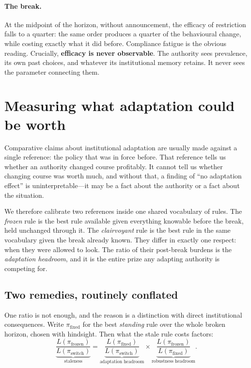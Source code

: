 \documentclass[11pt]{article}
\begin{document}
\paragraph{The break.} At the midpoint of the horizon, without announcement, the efficacy of
restriction falls to a quarter: the same order produces a quarter of the behavioural change, while
costing exactly what it did before. Compliance fatigue is the obvious reading. Crucially,
\textbf{efficacy is never observable}. The authority sees prevalence, its own past choices, and
whatever its institutional memory retains. It never sees the parameter connecting them.

\section{Measuring what adaptation could be worth}
\label{sec:headroom-social}

Comparative claims about institutional adaptation are usually made against a single reference: the
policy that was in force before. That reference tells us whether an authority changed course
profitably. It cannot tell us whether changing course was worth much, and without that, a finding of
``no adaptation effect'' is uninterpretable---it may be a fact about the authority or a fact about
the situation.

We therefore calibrate two references inside one shared vocabulary of rules. The \emph{frozen} rule
is the best rule available given everything knowable before the break, held unchanged through it.
The \emph{clairvoyant} rule is the best rule in the same vocabulary given the break already known.
They differ in exactly one respect: when they were allowed to look. The ratio of their post-break
burdens is the \emph{adaptation headroom}, and it is the entire prize any adapting authority is
competing for.

\subsection{Two remedies, routinely conflated}
\label{sec:two-remedies}

One ratio is not enough, and the reason is a distinction with direct institutional consequences.
Write $\pi_{\mathrm{fixed}}$ for the best \emph{standing} rule over the whole broken horizon, chosen
with hindsight. Then what the stale rule costs factors:
\begin{equation}
\underbrace{\frac{L(\pi_{\mathrm{frozen}})}{L(\pi_{\mathrm{switch}})}}_{\text{staleness}}
=
\underbrace{\frac{L(\pi_{\mathrm{fixed}})}{L(\pi_{\mathrm{switch}})}}_{\text{adaptation headroom}}
\times
\underbrace{\frac{L(\pi_{\mathrm{frozen}})}{L(\pi_{\mathrm{fixed}})}}_{\text{robustness headroom}} .
\end{equation}
\end{document}
